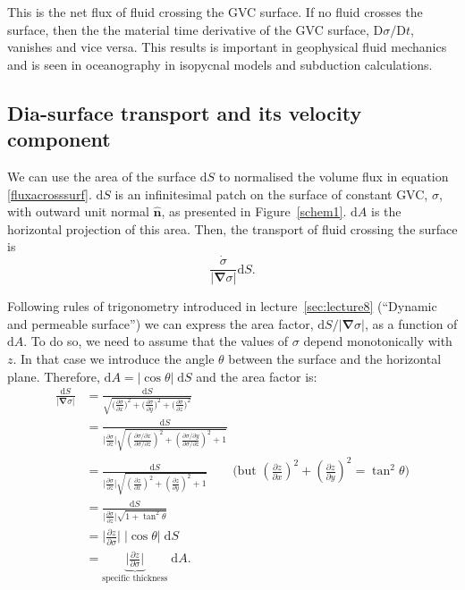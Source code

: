 This is the net flux of fluid crossing the GVC surface. If no fluid crosses the surface, then the the material time derivative of the GVC surface, $\mathrm{D}\sigma/\mathrm{D}t$, vanishes and vice versa. This results is important in geophysical fluid mechanics and is seen in oceanography in isopycnal models and subduction calculations.


\subsection{Dia-surface transport and its velocity component}

We can use the area of the surface $\mathrm{d}S$ to normalised the volume flux in equation \eqref{fluxacrosssurf}. $\mathrm{d}S$ is an infinitesimal patch on the surface of constant GVC, $\sigma$, with outward unit normal $\boldsymbol{\hat{n}}$, as presented in Figure~\ref{schem1}. $\mathrm{d}A$ is the horizontal projection of this area. Then, the transport of fluid crossing the surface is
\begin{equation}
\frac{\dot{\sigma}}{|\boldsymbol{\nabla} \sigma|} \mathrm{d}S .
\end{equation}

Following rules of trigonometry introduced in lecture~\ref{sec:lecture8} (``Dynamic and permeable surface'') we can express the area factor,  $\mathrm{d}S/|\boldsymbol{\nabla} \sigma|$, as a function of $\mathrm{d}A$. To do so, we need to assume that the values of $\sigma$ depend monotonically with $z$. In that case we introduce the angle $\theta$ between the surface and the horizontal plane. Therefore, $\mathrm{d}A=|\cos \theta| \; \mathrm{d}S$ and the area factor is:
\begin{align} 
\frac{\mathrm{d}S}{|\boldsymbol{\nabla} \sigma|} & = \frac{\mathrm{d}S}{\sqrt{\big(\frac{\partial \sigma}{\partial x}\big)^2+\big(\frac{\partial \sigma}{\partial y}\big)^2+\big(\frac{\partial \sigma}{\partial z}\big)^2}} \nonumber\\
& = \frac{\mathrm{d}S}{\big|\frac{\partial \sigma}{\partial z}\big| \sqrt{ \left(\tfrac{\partial \sigma/\partial x}{\partial \sigma/\partial z}\right)^2 + \left(\tfrac{\partial \sigma/\partial y}{\partial \sigma/\partial z}\right)^2 +1}} \nonumber\\
& = \frac{\mathrm{d}S}{\big|\frac{\partial \sigma}{\partial z}\big| \sqrt{ \left(\frac{\partial z}{\partial x}\right)^2 + \left(\frac{\partial z}{\partial y}\right)^2 +1}} \nonumber\qquad\text{(but }(\tfrac{\partial z}{\partial x})^2 + (\tfrac{\partial z}{\partial y})^2 = \tan^2\theta\text{)} \\
& = \frac{\mathrm{d}S}{\big|\frac{\partial \sigma}{\partial z}\big| \sqrt{1 + \tan^2 \theta}} \nonumber\\
& = \biggr\rvert\frac{\partial z}{\partial \sigma}\biggr\lvert \; |\cos \theta| \; \mathrm{d}S \nonumber\\
& = \underbrace{\biggr\rvert\frac{\partial z}{\partial \sigma}\biggr\lvert}_\text{specific thickness} \; \mathrm{d}A.  \label{eq13.10}
\end{align}

